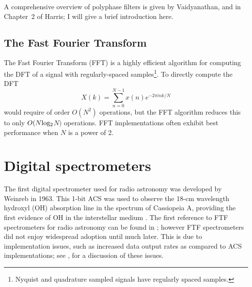 \documentclass{ws-rv961x669}
\begin{document}


A comprehensive overview of polyphase filters is given by Vaidyanathan\citet{Vaidyanathan:1990p6127}, and in Chapter~2 of Harris\citet{BookHarrisMultirateDSP}; I will give a brief introduction here. 

\subsection{The Fast Fourier Transform\label{sub:fft}}

The Fast Fourier Transform\cite{Cooley1965} (FFT) is a highly efficient algorithm for computing the DFT of a signal with regularly-spaced samples\footnote{Nyquist and quadrature sampled signals have regularly spaced samples.}. To directly compute the DFT
\begin{equation}
X(k)=\sum_{n=0}^{N-1}x(n)e^{-2\pi ink/N}\label{eq:dft1}
\end{equation}
would require of order $O(N^2)$ operations, but the FFT algorithm reduces this to only $O(N \rm{log_2}$$N)$ operations. FFT implementations often exhibit best performance when $N$ is a power of 2. 

\section{Digital spectrometers}

The first digital spectrometer used for radio astronomy was developed by Weinreb\citet{Weinreb:1963p10042} in 1963. This 1-bit ACS was used to observe the 18-cm wavelength hydroxyl (OH) absorption line in the spectrum of Cassiopeia A, providing the first evidence of OH in the interstellar medium \citep{Weinreb:1963p9992}. The first reference to FTF spectrometers for radio astronomy can be found in \citet{Chikada:1987p10044}; however FTF spectrometers did not enjoy widespread adoption until much later. This is due to implementation issues, such as increased data output rates as compared to ACS implementations; see \citet{Bunton2000}, for a discussion of these issues.
\end{document}
